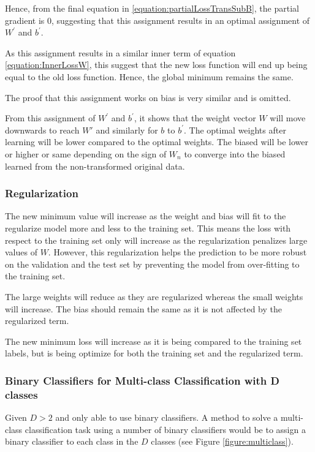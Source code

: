 \documentclass[a4paper,12pt]{article}
\begin{document}
Hence, from the final equation in \ref{equation:partialLossTransSubB}, the partial gradient is 0, suggesting that this assignment results in an optimal assignment of $W^{'}$ and $b^{'}$. 

As this assignment results in a similar inner term of equation \ref{equation:InnerLossW}, this suggest that the new loss function 
will end up being equal to the old loss function. Hence, the global minimum remains the same. 

The proof that this assignment works on bias is very similar and is omitted.

From this assignment of $W^{'}$ and $b^{'}$, it shows that the weight vector $W$ will move downwards to reach $W'$ and similarly for $b$ to $b^{'}$. The optimal weights  after learning will be lower compared to the optimal weights. The biased will be lower or higher or same depending on the sign of $W_{n}$ to converge into the biased learned from the non-transformed original data. 
\subsubsection{Regularization}

The new minimum value will increase as the weight and bias will fit to the regularize model more and less to the training set. 
This means the loss with respect to the training set only will increase as the regularization penalizes large values of $W$. However, this regularization helps the prediction to be more robust on the validation and the test set by preventing the model from over-fitting to the training set. 

The large weights will reduce as they are regularized whereas the small weights will increase. The bias should remain the same as it is not affected by the regularized term. 

The new minimum loss will increase as it is being compared to the training set labels, but is being optimize for both the training set and the regularized term. 
\subsubsection{Binary Classifiers for Multi-class Classification with D classes}

Given $D > 2$ and only able to use binary classifiers. A method to solve a multi-class classification task using a number of binary classifiers would be to assign a binary classifier to each class in the $D$ classes (see Figure \ref{figure:multiclass}). 
\end{document}
